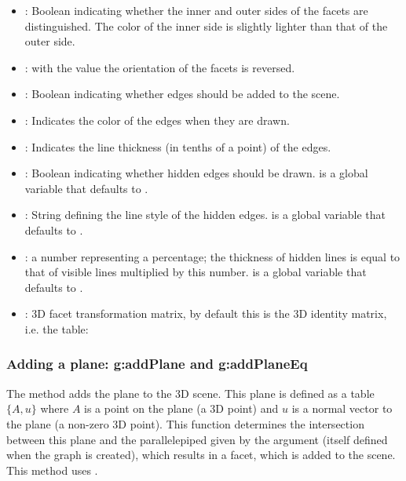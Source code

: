 \begin{itemize}
    \item {}: Boolean indicating whether the inner and outer sides of the facets are distinguished. The color of the inner side is slightly lighter than that of the outer side.
    
    \item {} : with the value \true the orientation of the facets is reversed.

    \item {}: Boolean indicating whether edges should be added to the scene.

    \item {}: Indicates the color of the edges when they are drawn.

    \item {}: Indicates the line thickness (in tenths of a point) of the edges.

    \item {}: Boolean indicating whether hidden edges should be drawn.  is a global variable that defaults to \false.

    \item {}: String defining the line style of the hidden edges.  is a global variable that defaults to .
    
    \item {}: a number representing a percentage; the thickness of hidden lines is equal to that of visible lines multiplied by this number.  is a global variable that defaults to .

     \item {}: 3D facet transformation matrix, by default this is the 3D identity matrix, i.e. the table: 
\end{itemize}


\subsubsection{Adding a plane: g:addPlane and g:addPlaneEq}

The  method adds the plane  to the 3D scene. This plane is defined as a table $\{A,u\}$ where $A$ is a point on the plane (a 3D point) and $u$ is a normal vector to the plane (a non-zero 3D point). This function determines the intersection between this plane and the parallelepiped given by the  argument (itself defined when the graph is created), which results in a facet, which is added to the scene. This method uses .

